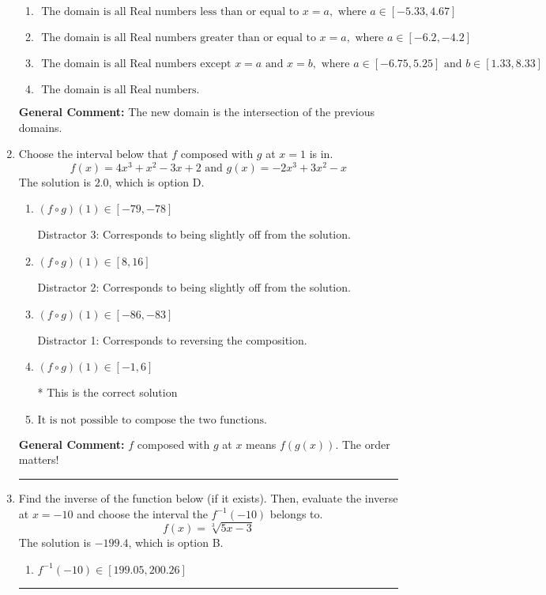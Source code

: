 \documentclass{extbook}[14pt]
\newcommand{\litem}[1]{\item #1

\rule{\textwidth}{0.4pt}}
\begin{document}
\begin{enumerate}
{\begin{enumerate}[label=\Alph*.]
\item \( \text{ The domain is all Real numbers less than or equal to } x = a, \text{ where } a \in [-5.33, 4.67] \)


\item \( \text{ The domain is all Real numbers greater than or equal to } x = a, \text{ where } a \in [-6.2, -4.2] \)


\item \( \text{ The domain is all Real numbers except } x = a \text{ and } x = b, \text{ where } a \in [-6.75, 5.25] \text{ and } b \in [1.33, 8.33] \)


\item \( \text{ The domain is all Real numbers. } \)


\end{enumerate}

\textbf{General Comment:} The new domain is the intersection of the previous domains.
}
\litem{
Choose the interval below that $f$ composed with $g$ at $x=1$ is in.
\[ f(x) = 4x^{3} + x^{2} -3 x + 2 \text{ and } g(x) = -2x^{3} +3 x^{2} -x \]The solution is \( 2.0 \), which is option D.\begin{enumerate}[label=\Alph*.]
\item \( (f \circ g)(1) \in [-79, -78] \)

 Distractor 3: Corresponds to being slightly off from the solution.
\item \( (f \circ g)(1) \in [8, 16] \)

 Distractor 2: Corresponds to being slightly off from the solution.
\item \( (f \circ g)(1) \in [-86, -83] \)

 Distractor 1: Corresponds to reversing the composition.
\item \( (f \circ g)(1) \in [-1, 6] \)

* This is the correct solution
\item \( \text{It is not possible to compose the two functions.} \)


\end{enumerate}

\textbf{General Comment:} $f$ composed with $g$ at $x$ means $f(g(x))$. The order matters!
}
\litem{
Find the inverse of the function below (if it exists). Then, evaluate the inverse at $x = -10$ and choose the interval the $f^{-1}(-10)$ belongs to.
\[ f(x) = \sqrt[3]{5 x - 3} \]The solution is \( -199.4 \), which is option B.\begin{enumerate}[label=\Alph*.]
\item \( f^{-1}(-10) \in [199.05, 200.26] \)


\end{enumerate}}
\end{enumerate}
\end{document}
